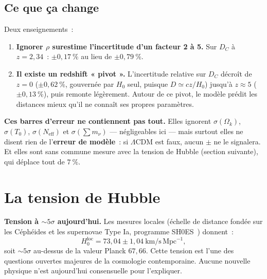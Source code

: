 \documentclass[11pt,a4paper,openany]{report}
\newcommand{\Mpc}{\text{Mpc}}
\newcommand{\kms}{\si{\km\per\second}}
\newcommand{\Hzero}{H_{0}}
\newcommand{\Ok}{\Omega_{k}}
\begin{document}
\subsection{Ce que ça change}



\noindent Deux enseignements~:

\begin{enumerate}[topsep=3pt]
\item \textbf{Ignorer $\rho$ surestime l'incertitude d'un facteur 2 à 5.}
Sur $D_{C}$ à $z = 2{,}34$~: $\pm0{,}17~\%$ au lieu de $\pm0{,}79~\%$.
\item \textbf{Il existe un redshift « pivot ».} L'incertitude relative sur
$D_{C}$ décroît de $z=0$ ($\pm0{,}62~\%$, gouvernée par $\Hzero$ seul, puisque
$D \simeq cz/\Hzero$) jusqu'à $z \approx 5$ ($\pm0{,}13~\%$), puis remonte
légèrement. Autour de ce pivot, le modèle prédit les distances mieux qu'il ne
connaît ses propres paramètres.
\end{enumerate}

\begin{tcolorbox}[attention]
\textbf{Ces barres d'erreur ne contiennent pas tout.} Elles ignorent
$\sigma(\Ok)$, $\sigma(T_{0})$, $\sigma(N_{\text{eff}})$ et
$\sigma(\sum m_{\nu})$ --- négligeables ici --- mais surtout elles ne disent
rien de l'\textbf{erreur de modèle}~: si $\Lambda$CDM est faux, aucun $\pm$ ne
le signalera. Et elles sont sans commune mesure avec la tension de Hubble
(section suivante), qui déplace tout de $7~\%$.
\end{tcolorbox}

\section{La tension de Hubble}

\begin{tcolorbox}[attention]
\textbf{Tension à $\sim 5\sigma$ aujourd'hui.} Les mesures locales (échelle
de distance fondée sur les Céphéides et les supernovae Type Ia, programme
SH0ES~\cite{Riess2022}) donnent~:
\[
\Hzero^{\text{loc}} = 73{,}04 \pm 1{,}04~\kms\,\Mpc^{-1},
\]
soit $\sim 5\sigma$ au-dessus de la valeur Planck $67{,}66$. Cette tension est
l'une des questions ouvertes majeures de la cosmologie contemporaine. Aucune
nouvelle physique n'est aujourd'hui consensuelle pour l'expliquer.
\end{tcolorbox}

\clearpage

\end{document}
